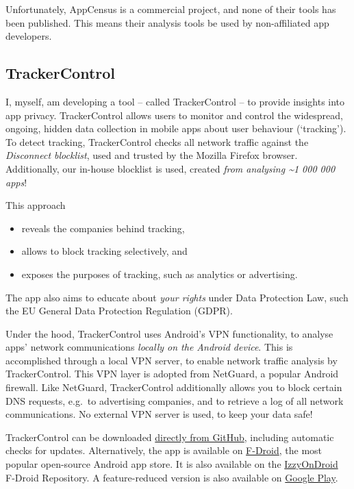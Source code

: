 \documentclass[
]{book}
\providecommand{\tightlist}{%
  \setlength{\itemsep}{0pt}\setlength{\parskip}{0pt}}
\begin{document}
Unfortunately, AppCensus is a commercial project, and none of their tools has been published. This means their analysis tools be used by non-affiliated app developers.

\hypertarget{trackercontrol}{%
\subsection{TrackerControl}\label{trackercontrol}}

I, myself, am developing a tool -- called TrackerControl -- to provide insights into app privacy. TrackerControl allows users to monitor and control the widespread, ongoing, hidden data collection in mobile apps about user behaviour (`tracking'). To detect tracking, TrackerControl checks all network traffic against the \emph{Disconnect blocklist}, used and trusted by the Mozilla Firefox browser. Additionally, our in-house blocklist is used, created \emph{from analysing \textasciitilde1 000 000 apps}!

This approach

\begin{itemize}
\tightlist
\item
  reveals the companies behind tracking,
\item
  allows to block tracking selectively, and
\item
  exposes the purposes of tracking, such as analytics or advertising.
\end{itemize}

The app also aims to educate about \emph{your rights} under Data Protection Law, such the EU General Data Protection Regulation (GDPR).

Under the hood, TrackerControl uses Android's VPN functionality, to analyse apps' network communications \emph{locally on the Android device}. This is accomplished through a local VPN server, to enable network traffic analysis by TrackerControl. This VPN layer is adopted from NetGuard, a popular Android firewall. Like NetGuard, TrackerControl additionally allows you to block certain DNS requests, e.g.~to advertising companies, and to retrieve a log of all network communications. No external VPN server is used, to keep your data safe!

TrackerControl can be downloaded \href{https://github.com/OxfordHCC/tracker-control-android/releases}{directly from GitHub}, including automatic checks for updates. Alternatively, the app is available on \href{https://f-droid.org/packages/net.kollnig.missioncontrol.fdroid}{F-Droid}, the most popular open-source Android app store. It is also available on the \href{https://apt.izzysoft.de/fdroid/index/apk/net.kollnig.missioncontrol}{IzzyOnDroid} F-Droid Repository. A feature-reduced version is also available on \href{https://play.google.com/store/apps/details?id=net.kollnig.missioncontrol.play}{Google Play}.
\end{document}
